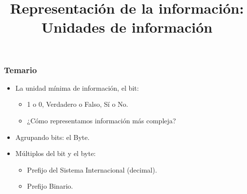\documentclass[11pt,a4paper,spanish]{beamer}
\title{Representación de la información:\\
Unidades de información}
\author{}
\date{}
\begin{document}
\begin{frame}[noframenumbering]


    \maketitle
    \centering

\end{frame}

\begin{frame}

    \frametitle{Temario}

\begin{itemize}

    \item La unidad mínima de información, el bit:
    \begin{itemize}
        \item 1 o 0, Verdadero o Falso, Sí o No.
        \item ¿Cómo representamos información más compleja?
    \end{itemize}

    \item Agrupando bits: el Byte.

    \item Múltiplos del bit y el byte:
    \begin{itemize}
        \item Prefijo del Sistema Internacional (decimal).
        \item Prefijo Binario.
    \end{itemize}

\end{itemize}
\end{frame}
\end{document}
